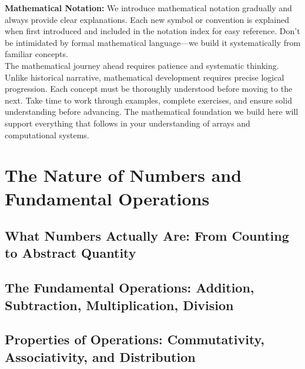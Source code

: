 \documentclass[12pt, oneside, openany]{book}
\begin{document}
\textbf{Mathematical Notation:} We introduce mathematical notation gradually and always provide clear explanations. Each new symbol or convention is explained when first introduced and included in the notation index for easy reference. Don't be intimidated by formal mathematical language—we build it systematically from familiar concepts.\\
The mathematical journey ahead requires patience and systematic thinking. Unlike historical narrative, mathematical development requires precise logical progression. Each concept must be thoroughly understood before moving to the next. Take time to work through examples, complete exercises, and ensure solid understanding before advancing. The mathematical foundation we build here will support everything that follows in your understanding of arrays and computational systems.


\chapter{The Nature of Numbers and Fundamental Operations}

\section{What Numbers Actually Are: From Counting to Abstract Quantity}

\section{The Fundamental Operations: Addition, Subtraction, Multiplication, Division}

\section{Properties of Operations: Commutativity, Associativity, and Distribution}
\end{document}
